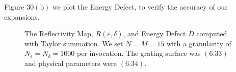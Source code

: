 Figure $30(\text{b})$ we plot the Energy Defect, to verify the accuracy of our expansions.
\vspace{-18mm}
\begin{figure}[H]
    \centering
    \vspace{3mm}
    \caption{The Reflectivity Map, $R(\varepsilon,\delta)$, and Energy Defect $D$
    computed with Taylor summation. We set $N=M=15$ 
    with a granularity of $N_{\varepsilon}=N_{\delta}=1000$ per invocation. The grating surface was $(6.33)$ and physical parameters were $(6.34)$.}
    \label{Fig:RM:Dielectric}
\end{figure}

